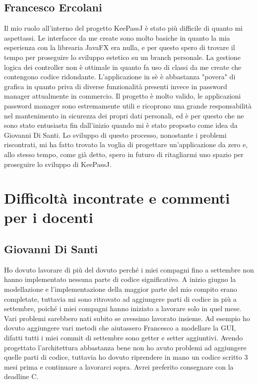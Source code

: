 \documentclass[a4paper,12pt]{report}
\begin{document}
\subsection*{Francesco Ercolani}
Il mio ruolo all'interno del progetto KeePassJ è stato più difficile di quanto mi aspettassi. 
Le interfacce da me create sono molto basiche in quanto la mia esperienza con la librearia JavaFX era nulla, 
e per questo spero di trovare il tempo per proseguire lo sviluppo estetico su un branch personale. 
La gestione logica dei controller non è ottimale in quanto fa uso di classi da me create che contengono codice ridondante. 
L'applicazione in sè è abbastanza "povera" di grafica in quanto priva di diverse funzionalità presenti invece in password manager attualmente in commercio.
Il progetto è molto valido, le applicazioni password manager sono estremamente utili e ricoprono una grande 
responsabilità nel mantenimento in sicurezza dei propri dati personali, ed è per questo che ne sono stato entusiasta fin dall'inizio quando mi è stato proposto come idea da Giovanni Di Santi.
Lo sviluppo di questo processo, nonostante i problemi riscontrati, mi ha fatto trovato la voglia di progettare un'applicazione da zero
 e, allo stesso tempo, come già detto, spero in futuro di ritagliarmi uno spazio per proseguire lo sviluppo di KeePassJ.

\section{Difficoltà incontrate e commenti per i docenti}

\subsection*{Giovanni Di Santi}

Ho dovuto lavorare di più del dovuto perché i miei compagni fino a settembre
non hanno implementato nessuna parte di codice significativo.
A inizio giugno la modellazione e l'implementazione della maggior parte del mio
compito erano completate, tuttavia mi sono ritrovato ad aggiungere parti di 
codice in più a settembre, poiché i miei compagni hanno iniziato a lavorare
solo in quel mese. Vari problemi sarebbero nati subito se avessimo lavorato
insieme. Ad esempio ho dovuto aggiungere vari metodi che aiutassero Francesco a modellare
la GUI, difatti tutti i miei commit di settembre sono getter e setter aggiuntivi.
Avendo progettato l'architettura abbastanza bene non ho avuto problemi ad aggiungere
quelle parti di codice, tuttavia ho dovuto riprendere in mano un codice scritto 3 mesi
prima e continuare a lavorarci sopra. Avrei preferito consegnare con la deadline C.
\end{document}
